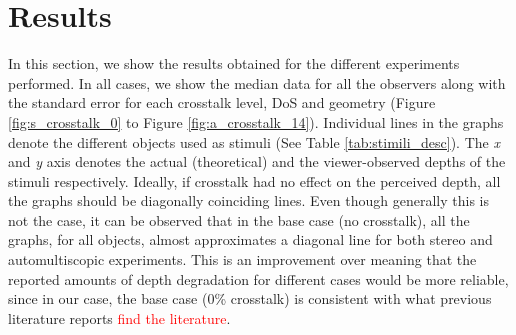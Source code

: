 \section{Results}

In this section, we show the results obtained for the different experiments performed. In all cases, we show the median data for all the observers along with the standard error for each crosstalk level, DoS and geometry (Figure \ref{fig:s_crosstalk_0} to Figure \ref{fig:a_crosstalk_14}). Individual lines in the graphs denote the different objects used as stimuli (See Table \ref{tab:stimili_desc}). The \emph{x} and \emph{y} axis denotes the actual (theoretical) and the viewer-observed depths of the stimuli respectively. Ideally, if crosstalk had no effect on the perceived depth, all the graphs should be diagonally coinciding lines. Even though generally this is not the case, it can be observed that in the base case (no crosstalk), all the graphs, for all objects, almost approximates a diagonal line for both stereo and automultiscopic experiments. This is an improvement over \cite{tsirlin2012effect} meaning that the reported amounts of depth degradation for different cases would be more reliable, since in our case, the base case (0\% crosstalk) is consistent with what previous literature reports \textcolor{red}{find the literature}.

